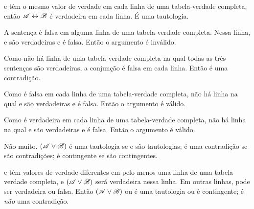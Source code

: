 \begin{earg}
\item %
 e  têm o mesmo valor de verdade em cada linha de uma tabela-verdade completa, então $\mathscr{A}\leftrightarrow\mathscr{B}$ é verdadeira em cada linha. É uma tautologia.
\item %
A sentença é falsa em alguma linha de uma tabela-verdade completa. Nessa linha,  e  são verdadeiras e  é falsa. Então o argumento é inválido.
\item %
Como não há linha de uma tabela-verdade completa na qual todas as três sentenças são verdadeiras, a conjunção é falsa em cada linha. Então é uma contradição.
\item %
Como  é falsa em cada linha de uma tabela-verdade completa, não há linha na qual  e  são verdadeiras e  é falsa. Então o argumento é válido.
\item %
Como  é verdadeira em cada linha de uma tabela-verdade completa, não há linha na qual  e  são verdadeiras e  é falsa. Então o argumento é válido.
\item %
Não muito. $(\mathscr{A}\vee\mathscr{B})$ é uma tautologia se  e  são tautologias; é uma contradição se são contradições; é contingente se são contingentes.
\item %
 e  têm valores de verdade diferentes em pelo menos uma linha de uma tabela-verdade completa, e $(\mathscr{A}\vee\mathscr{B})$ será verdadeira nessa linha. Em outras linhas, pode ser verdadeira ou falsa. Então $(\mathscr{A}\vee\mathscr{B})$ ou é uma tautologia ou é contingente; é \emph{não} uma contradição.
\end{earg}


